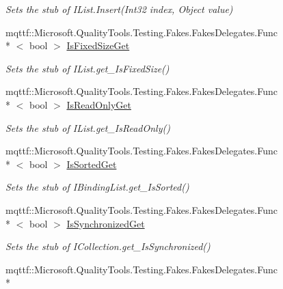 \begin{DoxyCompactItemize}
\begin{DoxyCompactList}\small\item\em Sets the stub of I\-List.\-Insert(\-Int32 index, Object value)\end{DoxyCompactList}\item 
mqttf\-::\-Microsoft.\-Quality\-Tools.\-Testing.\-Fakes.\-Fakes\-Delegates.\-Func\\*
$<$ bool $>$ \hyperlink{class_system_1_1_component_model_1_1_fakes_1_1_stub_i_binding_list_view_a27c8a97359a9a0779058820f6e188f93}{Is\-Fixed\-Size\-Get}
\begin{DoxyCompactList}\small\item\em Sets the stub of I\-List.\-get\-\_\-\-Is\-Fixed\-Size()\end{DoxyCompactList}\item 
mqttf\-::\-Microsoft.\-Quality\-Tools.\-Testing.\-Fakes.\-Fakes\-Delegates.\-Func\\*
$<$ bool $>$ \hyperlink{class_system_1_1_component_model_1_1_fakes_1_1_stub_i_binding_list_view_a56a9a25b76a00c5105f7e5959e0b59bd}{Is\-Read\-Only\-Get}
\begin{DoxyCompactList}\small\item\em Sets the stub of I\-List.\-get\-\_\-\-Is\-Read\-Only()\end{DoxyCompactList}\item 
mqttf\-::\-Microsoft.\-Quality\-Tools.\-Testing.\-Fakes.\-Fakes\-Delegates.\-Func\\*
$<$ bool $>$ \hyperlink{class_system_1_1_component_model_1_1_fakes_1_1_stub_i_binding_list_view_aa0d1dabea3177f3a9b5ee2079250d03b}{Is\-Sorted\-Get}
\begin{DoxyCompactList}\small\item\em Sets the stub of I\-Binding\-List.\-get\-\_\-\-Is\-Sorted()\end{DoxyCompactList}\item 
mqttf\-::\-Microsoft.\-Quality\-Tools.\-Testing.\-Fakes.\-Fakes\-Delegates.\-Func\\*
$<$ bool $>$ \hyperlink{class_system_1_1_component_model_1_1_fakes_1_1_stub_i_binding_list_view_a2a07f889ebc396d2106fb2eaf96bc309}{Is\-Synchronized\-Get}
\begin{DoxyCompactList}\small\item\em Sets the stub of I\-Collection.\-get\-\_\-\-Is\-Synchronized()\end{DoxyCompactList}\item 
mqttf\-::\-Microsoft.\-Quality\-Tools.\-Testing.\-Fakes.\-Fakes\-Delegates.\-Func\\*

\end{DoxyCompactItemize}
